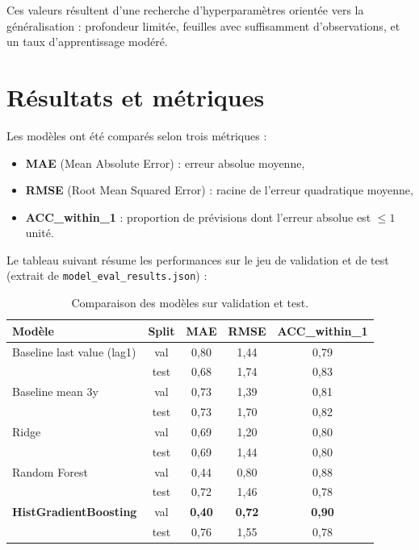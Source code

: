\documentclass[11pt,a4paper]{article}
\begin{document}
Ces valeurs résultent d'une recherche d'hyperparamètres orientée vers la généralisation : profondeur limitée, feuilles avec suffisamment d'observations, et un taux d'apprentissage modéré.

\section{Résultats et métriques}
\label{sec:resultats}

Les modèles ont été comparés selon trois métriques :

\begin{itemize}
  \item \textbf{MAE} (Mean Absolute Error) : erreur absolue moyenne,
  \item \textbf{RMSE} (Root Mean Squared Error) : racine de l'erreur quadratique moyenne,
  \item \textbf{ACC\_within\_1} : proportion de prévisions dont l'erreur absolue est $\leq 1$ unité.
\end{itemize}

Le tableau suivant résume les performances sur le jeu de validation et de test (extrait de \texttt{model\_eval\_results.json}) :

\begin{table}[h]
  \centering
  \small
  \begin{tabular}{lcccc}
    \toprule
    Modèle & Split & MAE & RMSE & ACC\_within\_1 \\
    \midrule
    Baseline last value (lag1) & val & 0{,}80 & 1{,}44 & 0{,}79 \\
                               & test & 0{,}68 & 1{,}74 & 0{,}83 \\
    Baseline mean 3y           & val & 0{,}73 & 1{,}39 & 0{,}81 \\
                               & test & 0{,}73 & 1{,}70 & 0{,}82 \\
    Ridge                      & val & 0{,}69 & 1{,}20 & 0{,}80 \\
                               & test & 0{,}69 & 1{,}44 & 0{,}80 \\
    Random Forest              & val & 0{,}44 & 0{,}80 & 0{,}88 \\
                               & test & 0{,}72 & 1{,}46 & 0{,}78 \\
    \textbf{HistGradientBoosting} & val & \textbf{0{,}40} & \textbf{0{,}72} & \textbf{0{,}90} \\
                               & test & 0{,}76 & 1{,}55 & 0{,}78 \\
    \bottomrule
  \end{tabular}
  \caption{Comparaison des modèles sur validation et test.}
\end{table}
\end{document}
